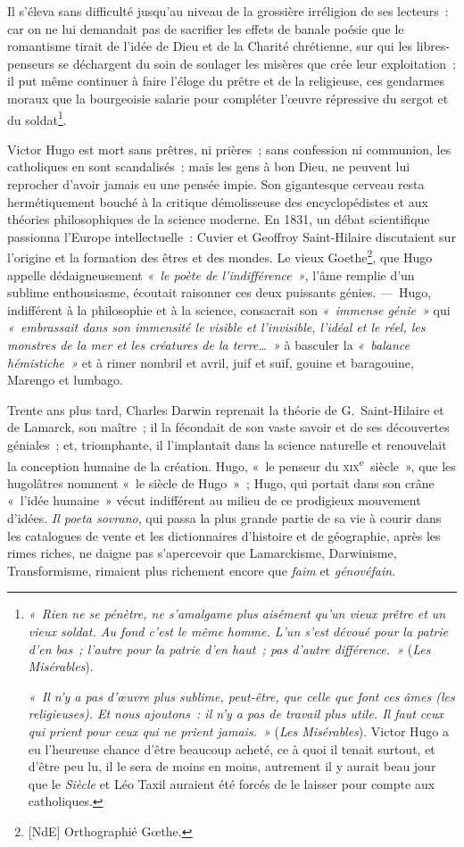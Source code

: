 \documentclass[french,twoside]{book} %
\begin{document}
Il s’éleva sans difficulté jusqu’au niveau de la grossière irréligion de ses lecteurs : car on ne lui demandait pas de sacrifier les effets de banale poésie que le romantisme tirait de l’idée de Dieu et de la Charité chrétienne, sur qui les libres-penseurs se déchargent du soin de soulager les misères que crée leur exploitation ; il put même continuer à faire l’éloge du prêtre et de la religieuse, ces gendarmes moraux que la bourgeoisie salarie pour compléter l’œuvre répressive du sergot et du soldat\footnote{\noindent \emph{« Rien ne se pénètre, ne s’amalgame plus aisément qu’un vieux prêtre et un vieux soldat. Au fond c’est le même homme. L’un s’est dévoué pour la patrie d’en bas ; l’autre pour la patrie d’en haut ; pas d’autre différence. »} (\emph{Les Misérables}).\par
\emph{« Il n’y a pas d’œuvre plus sublime, peut-être, que celle que font ces âmes (les religieuses). Et nous ajoutons : il n’y a pas de travail plus utile. Il faut ceux qui prient pour ceux qui ne prient jamais. »} (\emph{Les Misérables}). Victor Hugo a eu l’heureuse chance d’être beaucoup acheté, ce à quoi il tenait surtout, et d’être peu lu, il le sera de moins en moins, autrement il y aurait beau jour que le \emph{Siècle} et Léo Taxil auraient été forcés de le laisser pour compte aux catholiques.
}.\par
Victor Hugo est mort sans prêtres, ni prières ; sans confession ni communion, les catholiques en sont scandalisés ; mais les gens à bon Dieu, ne peuvent lui reprocher d’avoir jamais eu une pensée impie. Son gigantesque cerveau resta hermétiquement bouché à la critique démolisseuse des  
\label{p50}encyclopédistes et aux théories philosophiques de la science moderne. En 1831, un débat scientifique passionna l’Europe intellectuelle : Cuvier et Geoffroy Saint-Hilaire discutaient sur l’origine et la formation des êtres et des mondes. Le vieux Goethe\footnote{[NdE] Orthographié Gœthe.}, que Hugo appelle dédaigneusement \emph{« le poète de l’indifférence »}, l’âme remplie d’un sublime enthousiasme, écoutait raisonner ces deux puissants génies. — Hugo, indifférent à la philosophie et à la science, consacrait son \emph{« immense génie »} qui \emph{« embrassait dans son immensité le visible et l’invisible, l’idéal et le réel, les monstres de la mer et les créatures de la terre… »} à basculer la \emph{« balance hémistiche »} et à rimer nombril et avril, juif et suif, gouine et baragouine, Marengo et lumbago.\par
Trente ans plus tard, Charles Darwin reprenait la théorie de G. Saint-Hilaire et de Lamarck, son maître ; il la fécondait de son vaste savoir et de ses découvertes géniales ; et, triomphante, il l’implantait dans la science naturelle et renouvelait la conception humaine de la création. Hugo, « le penseur du \textsc{xix}\textsuperscript{e} siècle », que les hugolâtres nomment « le siècle de Hugo » ; Hugo, qui portait dans son crâne « l’idée humaine » vécut indifférent au milieu de ce prodigieux mouvement d’idées. {\itshape Il poeta sovrano}, qui passa la plus grande partie de sa vie à courir dans les catalogues de vente et les dictionnaires d’histoire et de géographie, après les rimes riches, ne daigne pas s’apercevoir que Lamarckisme, Darwinisme, Transformisme, rimaient plus richement encore que {\itshape faim} et {\itshape génovéfain}.
\end{document}

